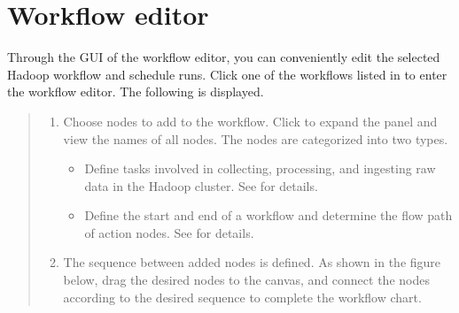 \documentclass[letterpaper,10pt,english]{sphinxmanual}
\begin{document}
\chapter{Workflow editor}
\label{\detokenize{integrator/part03/index:workflow-editor}}\label{\detokenize{integrator/part03/index:id1}}\label{\detokenize{integrator/part03/index::doc}}
Through the GUI of the workflow editor, you can conveniently edit the selected Hadoop workflow and schedule runs. Click one of the workflows listed in {\hyperref[\detokenize{integrator/part02/index:workflow-list}]{}} to enter the workflow editor. The following is displayed.
\begin{quote}

\begin{figure}[H]
\centering

\noindent{}
\end{figure}
\begin{enumerate}
\def\theenumi{\arabic{enumi}}
\def\labelenumi{\theenumi .}
\makeatletter\def\p@enumii{\p@enumi \theenumi .}\makeatother
\item {} 
 Choose nodes to add to the workflow. Click  to expand the panel and view the names of all nodes. The nodes are categorized into two types.
\begin{itemize}
\item {} 
 Define tasks involved in collecting, processing, and ingesting raw data in the Hadoop cluster. See {\hyperref[\detokenize{integrator/part03/tasks:action-nodes}]{}} for details.

\item {} 
 Define the start and end of a workflow and determine the flow path of action nodes. See {\hyperref[\detokenize{integrator/part03/control_flow:control-flow-nodes}]{}} for details.

\end{itemize}

\item {} 
 The sequence between added nodes is defined. As shown in the figure below, drag the desired nodes to the canvas, and connect the nodes according to the desired sequence to complete the workflow chart.
\begin{quote}


\end{quote}
\end{enumerate}
\end{quote}
\end{document}
